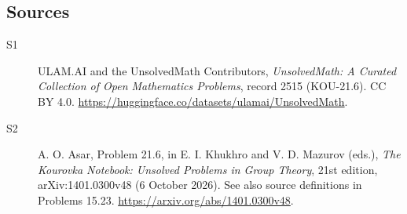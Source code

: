 \documentclass[11pt]{article}
\begin{document}
\subsection{Sources}
\begin{description}
\item[\hypertarget{source:2515:1}{S1}] ULAM.AI and the UnsolvedMath Contributors, \emph{UnsolvedMath: A Curated Collection of Open Mathematics Problems}, record 2515 (KOU-21.6). CC BY 4.0. \url{https://huggingface.co/datasets/ulamai/UnsolvedMath}.
\item[\hypertarget{source:2515:2}{S2}] A. O. Asar, Problem 21.6, in E. I. Khukhro and V. D. Mazurov (eds.), \emph{The Kourovka Notebook: Unsolved Problems in Group Theory}, 21st edition, arXiv:1401.0300v48 (6 October 2026). See also source definitions in Problems 15.23. \url{https://arxiv.org/abs/1401.0300v48}.
\end{description}
\label{end:2515}
\end{document}
